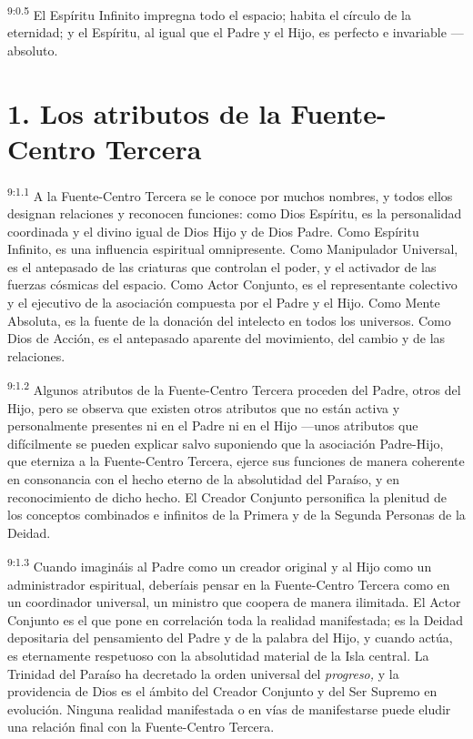 \par
\textsuperscript{9:0.5} El Espíritu Infinito impregna todo el espacio; habita el círculo de la eternidad; y el Espíritu, al igual que el Padre y el Hijo, es perfecto e invariable ---absoluto.

\section*{1. Los atributos de la Fuente-Centro Tercera}
\par
\textsuperscript{9:1.1} A la Fuente-Centro Tercera se le conoce por muchos nombres, y todos ellos designan relaciones y reconocen funciones: como Dios Espíritu, es la personalidad coordinada y el divino igual de Dios Hijo y de Dios Padre. Como Espíritu Infinito, es una influencia espiritual omnipresente. Como Manipulador Universal, es el antepasado de las criaturas que controlan el poder, y el activador de las fuerzas cósmicas del espacio. Como Actor Conjunto, es el representante colectivo y el ejecutivo de la asociación compuesta por el Padre y el Hijo. Como Mente Absoluta, es la fuente de la donación del intelecto en todos los universos. Como Dios de Acción, es el antepasado aparente del movimiento, del cambio y de las relaciones.

\par
\textsuperscript{9:1.2} Algunos atributos de la Fuente-Centro Tercera proceden del Padre, otros del Hijo, pero se observa que existen otros atributos que no están activa y personalmente presentes ni en el Padre ni en el Hijo ---unos atributos que difícilmente se pueden explicar salvo suponiendo que la asociación Padre-Hijo, que eterniza a la Fuente-Centro Tercera, ejerce sus funciones de manera coherente en consonancia con el hecho eterno de la absolutidad del Paraíso, y en reconocimiento de dicho hecho. El Creador Conjunto personifica la plenitud de los conceptos combinados e infinitos de la Primera y de la Segunda Personas de la Deidad.

\par
\textsuperscript{9:1.3} Cuando imagináis al Padre como un creador original y al Hijo como un administrador espiritual, deberíais pensar en la Fuente-Centro Tercera como en un coordinador universal, un ministro que coopera de manera ilimitada. El Actor Conjunto es el que pone en correlación toda la realidad manifestada; es la Deidad depositaria del pensamiento del Padre y de la palabra del Hijo, y cuando actúa, es eternamente respetuoso con la absolutidad material de la Isla central. La Trinidad del Paraíso ha decretado la orden universal del \textit{progreso,} y la providencia de Dios es el ámbito del Creador Conjunto y del Ser Supremo en evolución. Ninguna realidad manifestada o en vías de manifestarse puede eludir una relación final con la Fuente-Centro Tercera.


